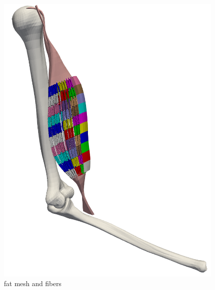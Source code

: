 \begin{figure}
  \centering%
  \includegraphics[width=\textwidth]{images/parallel_fiber_estimation/partitioning_biceps.png}%
  \caption{fat mesh and fibers}%
  \label{fig:partitioning_biceps}%
\end{figure}%

